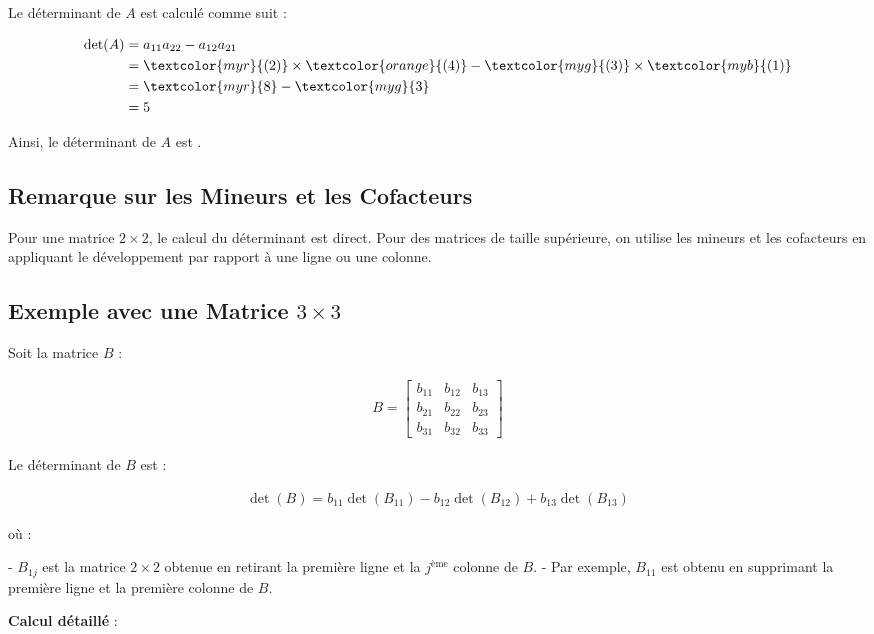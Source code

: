 \documentclass{report}
\begin{document}
\begin{multicols*}{2}
Le déterminant de $A$ est calculé comme suit :

\begin{align*}
    \det(A) &= a_{11} a_{22} - a_{12} a_{21} \\
            &= \textcolor{myr}{(2)} \times \textcolor{orange}{(4)} - \textcolor{myg}{(3)} \times \textcolor{myb}{(1)} \\
            &= \textcolor{myr}{8} - \textcolor{myg}{3} \\
            &= 5
\end{align*}

Ainsi, le déterminant de $A$ est .

\subsection{Remarque sur les Mineurs et les Cofacteurs}

Pour une matrice $2 \times 2$, le calcul du déterminant est direct. Pour des matrices de taille supérieure, on utilise les mineurs et les cofacteurs en appliquant le développement par rapport à une ligne ou une colonne.

\subsection{Exemple avec une Matrice $3 \times 3$}

Soit la matrice $B$ :

\begin{align*}
    B = \begin{bmatrix}
        b_{11} & b_{12} & b_{13} \\
        b_{21} & b_{22} & b_{23} \\
        b_{31} & b_{32} & b_{33}
    \end{bmatrix}
\end{align*}

Le déterminant de $B$ est :

\begin{align*}
    \det(B) = b_{11} \det(B_{11}) - b_{12} \det(B_{12}) + b_{13} \det(B_{13})
\end{align*}

où :

- $B_{1j}$ est la matrice $2 \times 2$ obtenue en retirant la première ligne et la $j^\text{ème}$ colonne de $B$.
- Par exemple, $B_{11}$ est obtenu en supprimant la première ligne et la première colonne de $B$.

\noindent \textbf{Calcul détaillé} :


\end{multicols*}
\end{document}
